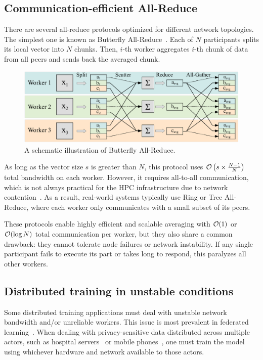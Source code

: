 \subsection{Communication-efficient All-Reduce}\label{sect:related_allreduce}
There are several all-reduce protocols optimized for different network topologies. The simplest one is known as Butterfly All-Reduce~\cite{bandwidth_optimal_allreduce}. Each of $N$ participants splits its local vector into $N$ chunks. Then, $i$-th worker aggregates $i$-th chunk of data from all peers and sends back the averaged chunk.

\begin{figure}[h!]
    \centering
    \includegraphics[width=0.65\linewidth]{resources/butterfly.pdf}
    \caption{A schematic illustration of Butterfly All-Reduce.}
    \label{fig:butterfly_allreduce}
\end{figure}

As long as the vector size $s$ is greater than $N$, this protocol uses ${\cal O}\left(s \times \frac{N - 1}{N}\right)$ total bandwidth on each worker. However, it requires all-to-all communication, which is not always practical for the HPC infrastructure due to network contention~\cite{bandwidth_optimal_allreduce}. As a result, real-world systems typically use Ring or Tree All-Reduce, where each worker only communicates with a small subset of its peers.

These protocols enable highly efficient and scalable averaging with ${\cal O}(1)$ or ${\cal O}(\log N)$ total communication per worker, but they also share a common drawback: they cannot tolerate node failures or network instability. If any single participant fails to execute its part or takes long to respond, this paralyzes all other workers.

\subsection{Distributed training in unstable conditions}\label{sect:related_unreliable}
Some distributed training applications must deal with unstable network bandwidth and/or unreliable workers. This issue is most prevalent in federated learning~\cite{mcmahan2017communication,secure_aggregation,federatedlearningatscale}. When dealing with privacy-sensitive data distributed across multiple actors, such as hospital servers~\cite{fed_intel,fed_nvidia} or mobile phones~\cite{fed_google1,fed_google2}, one must train the model using whichever hardware and network available to those actors.

